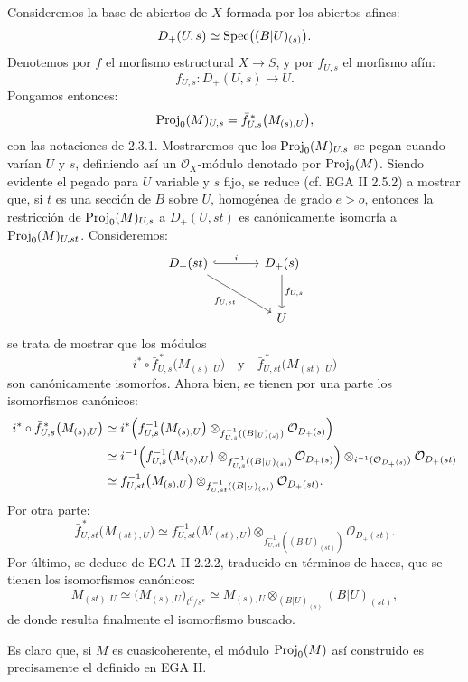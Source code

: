 Consideremos la base de abiertos de \(X\) formada por los abiertos afines:
\[
  D_+(U,s)\simeq \Spec\bigl((B|U)_{(s)}\bigr) .
\]
Denotemos por \(f\) el morfismo estructural \(X\to S\), y por \(f_{U,s}\) el morfismo afín:
\[
  f_{U,s}:D_+(U,s)\longrightarrow U .
\]
Pongamos entonces:
\[
  \Proj_0(M)_{U,s}
  =
  \bar f_{U,s}^{\,*}\bigl(M_{(s),U}\bigr),
\]
con las notaciones de 2.3.1. Mostraremos que los \(\Proj_0(M)_{U,s}\) se pegan cuando varían \(U\) y \(s\), definiendo así un \(\mathcal O_X\)-módulo denotado por \(\Proj_0(M)\). Siendo evidente el pegado para \(U\) variable y \(s\) fijo, se reduce (cf. EGA II 2.5.2) a mostrar que, si \(t\) es una sección de \(B\) sobre \(U\), homogénea de grado \(e>o\), entonces la restricción de \(\Proj_0(M)_{U,s}\) a \(D_+(U,st)\) es canónicamente isomorfa a \(\Proj_0(M)_{U,st}\). Consideremos:
\[
\begin{tikzcd}[column sep=large,row sep=large]
D_+(st) \arrow[r,hook,"i"] \arrow[dr,"f_{U,st}"'] &
D_+(s) \arrow[d,"f_{U,s}"]\\
& U
\end{tikzcd}
\]
se trata de mostrar que los módulos
\[
  i^*\circ\bar f_{U,s}^{\,*}\bigl(M_{(s),U}\bigr)
  \quad\text{y}\quad
  \bar f_{U,st}^{\,*}\bigl(M_{(st),U}\bigr)
\]
son canónicamente isomorfos. Ahora bien, se tienen por una parte los isomorfismos canónicos:
\[
\begin{aligned}
i^*\circ\bar f_{U,s}^{\,*}\bigl(M_{(s),U}\bigr)
&\simeq
i^*\Bigl(f_{U,s}^{-1}\bigl(M_{(s),U}\bigr)
 \otimes_{f_{U,s}^{-1}((B|_U)_{(s)})}\mathcal O_{D_+(s)}\Bigr)\\
&\simeq
i^{-1}\Bigl(\sisi{i_{U,s}^{-1}}{f_{U,s}^{-1}}\bigl(M_{(s),U}\bigr)
 \otimes_{f_{U,s}^{-1}((B|_U)_{(s)})}\mathcal O_{D_+(s)}\Bigr)
 \otimes_{i^{-1}(\mathcal O_{D_+(s)})}\mathcal O_{D_+(st)}\\
&\simeq
f_{U,st}^{-1}\bigl(M_{(s),U}\bigr)
 \otimes_{f_{U,st}^{-1}((B|_U)_{(s)})}\mathcal O_{D_+(st)} .
\end{aligned}
\]
Por otra parte:
\[
  \bar f_{U,st}^{\,*}\bigl(M_{(st),U}\bigr)
  \simeq
  f_{U,st}^{-1}\bigl(M_{(st),U}\bigr)
  \otimes_{f_{U,st}^{-1}((B|U)_{(st)})}\mathcal O_{D_+(st)} .
\]
Por último, se deduce de EGA II 2.2.2, traducido en términos de haces, que se tienen los isomorfismos canónicos:
\[
  M_{(st),U}\simeq
  \bigl(M_{(s),U}\bigr)_{t^d/s^e}
  \simeq
  M_{(s),U}\otimes_{(B|U)_{(s)}}(B|U)_{(st)},
\]
de donde resulta finalmente el isomorfismo buscado.

Es claro que, si \(M\) es cuasicoherente, el módulo \(\Proj_0(M)\) así construido es precisamente el definido en EGA II.

